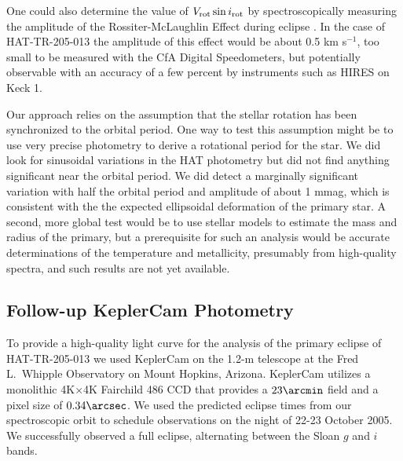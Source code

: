 \documentclass[12pt, preprint]{aastex}
\begin{document}
One could also determine the value of $V_{\rm rot} \sin i_{\rm rot}$ by spectroscopically measuring the amplitude of the Rossiter-McLaughlin Effect during eclipse \citep{gaudi2007}. In the case of HAT-TR-205-013 the amplitude of this effect would be about 0.5 km s$^{-1}$, too small to be measured with the CfA Digital Speedometers, but potentially observable with an accuracy of a few percent by instruments such as HIRES on Keck 1.

Our approach relies on the assumption that the stellar rotation has been synchronized to the orbital period.  One way to test this assumption might be to use very precise photometry to derive a rotational period for the star. We did look for sinusoidal variations in the HAT photometry but did not find anything significant near the orbital period. We did detect a marginally significant variation with half the orbital period and amplitude of about 1 mmag, which is consistent with the the expected ellipsoidal deformation of the primary star. A second, more global test would be to use stellar models to estimate the mass and radius of the primary, but a prerequisite for such an analysis would be accurate determinations of the temperature and metallicity, presumably from high-quality spectra, and such results are not yet available.

\subsection{Follow-up KeplerCam Photometry} 

To provide a high-quality light curve for the analysis of the primary
eclipse of HAT-TR-205-013 we used KeplerCam on the 1.2-m telescope at
the Fred L.\ Whipple Observatory on Mount Hopkins, Arizona. KeplerCam
utilizes a monolithic 4K$\times$4K Fairchild 486 CCD that provides a
$23 \arcmin$ field and a pixel size of $0.34 \arcsec$. We used the
predicted eclipse times from our spectroscopic orbit to schedule
observations on the night of 22-23 October 2005. We successfully
observed a full eclipse, alternating between the Sloan $g$ and $i$ bands.
\end{document}
